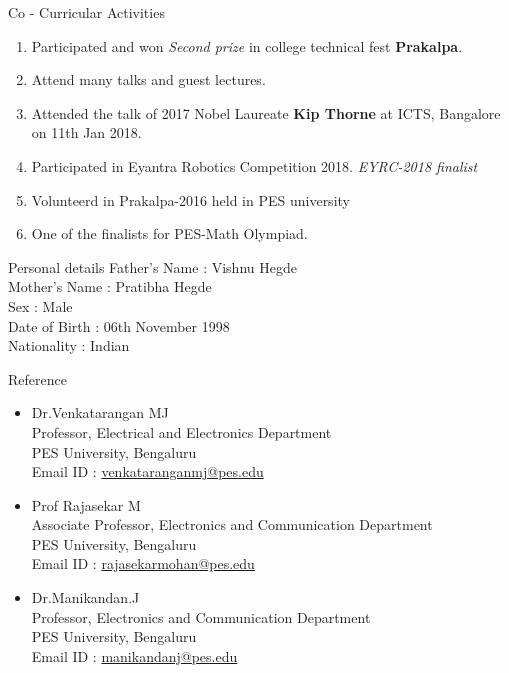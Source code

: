 \documentclass{resume} %
\begin{document}
\vspace{1cm}



\begin{rSection}{Co - Curricular Activities}
\begin{enumerate}
    \item Participated and won \textit{Second prize} in college technical fest {\bf Prakalpa}.
    \item Attend many talks and guest lectures.
    \item Attended the talk of 2017 Nobel Laureate {\bf Kip Thorne} at ICTS, Bangalore on 11th Jan 2018.
    \item Participated in Eyantra Robotics Competition 2018. \textit{EYRC-2018 finalist} 
    \item Volunteerd in Prakalpa-2016 held in PES university
    \item One of the finalists for PES-Math Olympiad.
\end{enumerate}
\end{rSection}



\begin{rSection}{Personal details}
Father's Name : Vishnu Hegde \\
Mother's Name : Pratibha Hegde \\
Sex : Male \\
Date of Birth : 06th November 1998 \\
Nationality : Indian \\

\end{rSection}





\begin{rSection}{Reference}
\begin{itemize}

	\item Dr.Venkatarangan MJ\\
		Professor, Electrical and Electronics Department\\
		PES University, Bengaluru\\
		Email ID : \href{http://13.232.26.175/p10106}{venkataranganmj@pes.edu} \\

	\item Prof Rajasekar M\\
		Associate Professor, Electronics and Communication Department\\
		PES University, Bengaluru\\
		Email ID :  \href{https://faculty.pes.edu/p10125}{rajasekarmohan@pes.edu} \\
		
	\item Dr.Manikandan.J\\
		Professor, Electronics and Communication Department\\
		PES University, Bengaluru\\
		Email ID : \href{https://faculty.pes.edu/p10116}{manikandanj@pes.edu}
\end{itemize}
\end{rSection}
\end{document}
